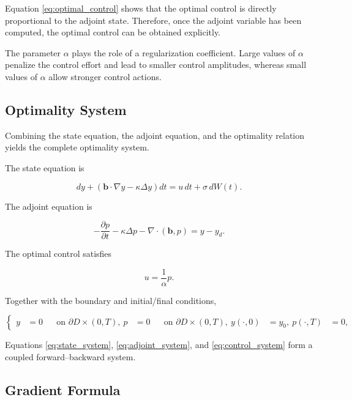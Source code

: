 Equation \eqref{eq:optimal_control} shows that the optimal control is directly proportional to 
the adjoint state. Therefore, once the adjoint variable has been computed, the optimal control 
can be obtained explicitly.

The parameter \(\alpha\) plays the role of a regularization coefficient. Large values of \(\alpha\) 
penalize the control effort and lead to smaller control amplitudes, whereas small values of 
\(\alpha\) allow stronger control actions.

\subsection{Optimality System}

Combining the state equation, the adjoint equation, and the optimality relation yields the complete 
optimality system.

The state equation is

\begin{equation}
dy
+
\left(
\mathbf b\cdot\nabla y
-
\kappa \Delta y
\right)dt
=
u\,dt
+
\sigma\,dW(t).
\label{eq:state_system}
\end{equation}

The adjoint equation is

\begin{equation}
-\frac{\partial p}{\partial t}
-\kappa \Delta p
-\nabla\cdot(\mathbf b,p)
=
y-y_d.
\label{eq:adjoint_system}
\end{equation}

The optimal control satisfies

\begin{equation}
u
=
\frac{1}{\alpha}p.
\label{eq:control_system}
\end{equation}

Together with the boundary and initial/final conditions,

\begin{equation}
\left\{
\begin{aligned}
y &=0
&&\text{on }
\partial D\times(0,T),
\
p &=0
&&\text{on }
\partial D\times(0,T),
\
y(\cdot,0)&=y_0,
\
p(\cdot,T)&=0,
\end{aligned}
\right.
\label{eq:boundary_conditions_system}
\end{equation}

Equations
\eqref{eq:state_system},
\eqref{eq:adjoint_system},
and
\eqref{eq:control_system}
form a coupled forward--backward system.

\subsection{Gradient Formula}

